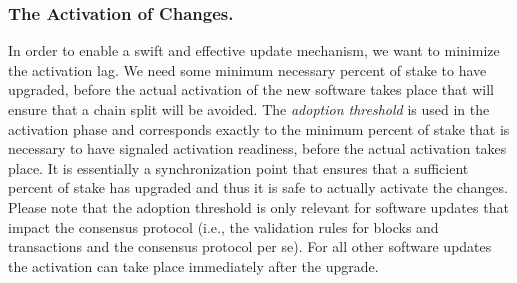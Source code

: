 \subsubsection{The Activation of Changes.}\label{se:informal}
In order to enable a swift and effective update mechanism, we want to minimize the activation lag. 
We need some minimum necessary percent of stake to have upgraded, before the actual activation of the new software takes place that will ensure that a chain split will be avoided. The \emph{adoption threshold} is used in the activation phase and corresponds exactly to the minimum percent of stake that is necessary to have signaled activation readiness, before the actual activation takes place. It is essentially a synchronization point that ensures that a sufficient percent of stake has upgraded and thus it is safe to actually activate the changes. 
 Please note that the adoption threshold is only relevant for software updates that impact the consensus protocol (i.e., the validation rules for blocks and transactions and the consensus protocol per se). For all other software updates the activation can take place immediately after the upgrade.

